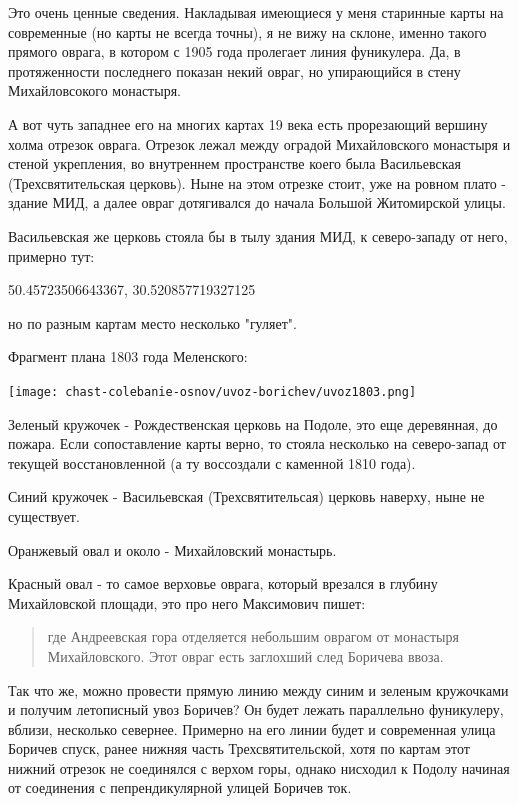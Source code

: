 Это очень ценные сведения. Накладывая имеющиеся у меня старинные карты на современные (но карты не всегда точны), я не вижу на склоне, именно такого прямого оврага, в котором с 1905 года пролегает линия фуникулера. Да, в протяженности последнего показан некий овраг, но упирающийся в стену Михайловсокого монастыря. 

А вот чуть западнее его на многих картах 19 века есть прорезающий вершину холма 
отрезок оврага. Отрезок лежал между оградой Михайловского монастыря и стеной укрепления, во внутреннем пространстве коего была Васильевская (Трехсвятительская церковь). Ныне на этом отрезке стоит, уже на ровном плато - здание МИД, а далее овраг дотягивался до начала Большой Житомирской улицы.

Васильевская же церковь стояла бы в тылу здания МИД, к северо-западу от него, примерно тут:

50.45723506643367, 30.520857719327125

но по разным картам место несколько "гуляет".

Фрагмент плана 1803 года Меленского:

\begin{center}
\texttt{[image: chast-colebanie-osnov/uvoz-borichev/uvoz1803.png]}
\end{center}

Зеленый кружочек - Рождественская церковь на Подоле, это еще деревянная, до пожара. Если сопоставление карты верно, то стояла несколько на северо-запад от текущей восстановленной (а ту воссоздали с каменной 1810 года).

Синий кружочек - Васильевская (Трехсвятительсая) церковь наверху, ныне не существует.

Оранжевый овал и около - Михайловский монастырь.

Красный овал - то самое верховье оврага, который врезался в глубину Михайловской площади, это про него Максимович пишет:

\begin{quotation}
где Андреевская гора отделяется небольшим оврагом от монастыря Михайловского. Этот овраг есть заглохший след Боричева ввоза.\end{quotation}

Так что же, можно провести прямую линию между синим и зеленым кружочками и получим летописный увоз Боричев? Он будет лежать параллельно фуникулеру, вблизи, несколько севернее. Примерно на его линии будет и современная улица Боричев спуск, ранее нижняя часть Трехсвятительской, хотя по картам этот нижний отрезок не соединялся с верхом горы, однако нисходил к Подолу начиная от соединения с пепрендикулярной улицей Боричев ток. 

